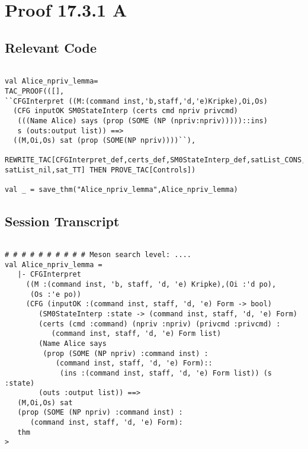 \documentclass{report}
\begin{document}
\begin{quote}
\HOLSMZeroSolutionsTheoremsAliceXXnprivXXlemma
{}\HOLSMZeroSolutionsTheoremsAliceXXexecXXnprivXXjustifiedXXthm
{}\HOLSMZeroSolutionsTheoremsAliceXXnprivXXverifiedXXthm
{}\HOLSMZeroSolutionsTheoremsAliceXXjustifiedXXnprivXXexecXXthm
\end{quote}

\section{Proof 17.3.1 A}
\label{proof-1}

\subsection{Relevant Code}
\label{rel-code-1}
\begin{lstlisting}[frame=TBlr]

val Alice_npriv_lemma=
TAC_PROOF(([],
``CFGInterpret ((M:(command inst,'b,staff,'d,'e)Kripke),Oi,Os)
  (CFG inputOK SM0StateInterp (certs cmd npriv privcmd)
   (((Name Alice) says (prop (SOME (NP (npriv:npriv)))))::ins)
   s (outs:output list)) ==>
  ((M,Oi,Os) sat (prop (SOME(NP npriv))))``),
  REWRITE_TAC[CFGInterpret_def,certs_def,SM0StateInterp_def,satList_CONS, 
satList_nil,sat_TT] THEN PROVE_TAC[Controls])

val _ = save_thm("Alice_npriv_lemma",Alice_npriv_lemma)
\end{lstlisting}

\subsection{Session Transcript}
\label{trans1}
\begin{session}
  \begin{scriptsize}
\begin{verbatim}

# # # # # # # # # # Meson search level: ....
val Alice_npriv_lemma =
   |- CFGInterpret
     ((M :(command inst, 'b, staff, 'd, 'e) Kripke),(Oi :'d po),
      (Os :'e po))
     (CFG (inputOK :(command inst, staff, 'd, 'e) Form -> bool)
        (SM0StateInterp :state -> (command inst, staff, 'd, 'e) Form)
        (certs (cmd :command) (npriv :npriv) (privcmd :privcmd) :
           (command inst, staff, 'd, 'e) Form list)
        (Name Alice says
         (prop (SOME (NP npriv) :command inst) :
            (command inst, staff, 'd, 'e) Form)::
             (ins :(command inst, staff, 'd, 'e) Form list)) (s :state)
        (outs :output list)) ==>
   (M,Oi,Os) sat
   (prop (SOME (NP npriv) :command inst) :
      (command inst, staff, 'd, 'e) Form):
   thm
> 

\end{verbatim}
  \end{scriptsize}
\end{session}
\pagebreak
\end{document}
